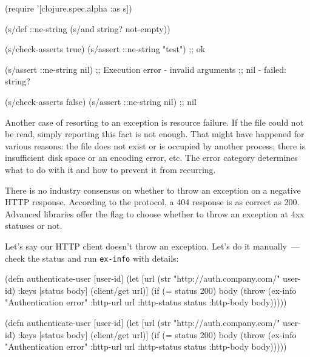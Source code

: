 \else

\begin{clojure}
(require '[clojure.spec.alpha :as s])

(s/def ::ne-string (s/and string? not-empty))

(s/check-asserts true)
(s/assert ::ne-string "test") ;; ok

(s/assert ::ne-string nil)
;; Execution error - invalid arguments
;; nil - failed: string?

(s/check-asserts false)
(s/assert ::ne-string nil) ;; nil
\end{clojure}

\fi

Another case of resorting to an exception is resource failure. If the file could not be read, simply reporting this fact is not enough. That might have happened for various reasons: the file does not exist or is occupied by another process; there is insufficient disk space or an encoding error, etc. The error category determines what to do with it and how to prevent it from recurring.


There is no industry consensus on whether to throw an exception on a negative HTTP response. According to the protocol, a 404 response is as correct as 200. Advanced libraries offer the flag to choose whether to throw an exception at 4xx statuses or not.

Let's say our HTTP client doesn't throw an exception. Let's do it manually~--- check the status and run \verb|ex-info| with details:


\ifnarrow

\begin{clojure}
(defn authenticate-user [user-id]
  (let [url (str
              "http://auth.company.com/"
              user-id)
        {:keys [status body]}
        (client/get url)]
    (if (= status 200)
      body
      (throw (ex-info
               "Authentication error"
               {:http-url url
                :http-status status
                :http-body body})))))
\end{clojure}

\else

\begin{clojure}
(defn authenticate-user [user-id]
  (let [url (str "http://auth.company.com/" user-id)
        {:keys [status body]} (client/get url)]
    (if (= status 200)
      body
      (throw (ex-info "Authentication error"
                      {:http-url url
                       :http-status status
                       :http-body body})))))
\end{clojure}

